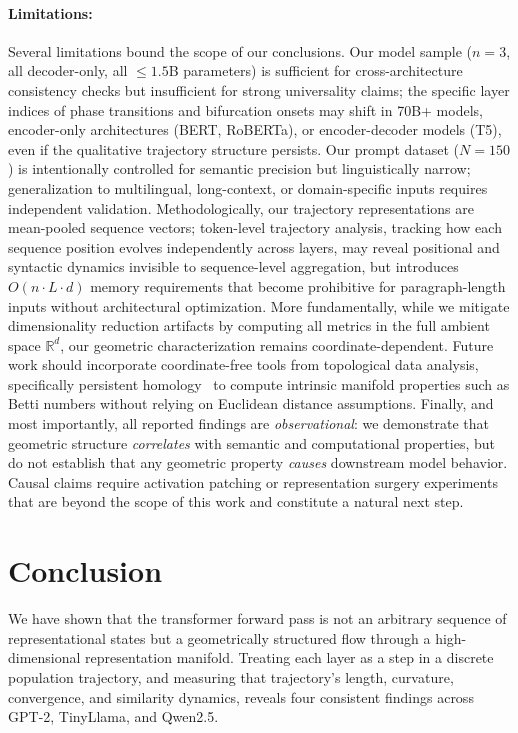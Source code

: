 \documentclass{article}
\begin{document}
\paragraph{Limitations:} Several limitations bound the scope of our conclusions. Our model sample ($n = 3$, all decoder-only, all $\leq 1.5$B parameters) is sufficient for cross-architecture consistency checks but insufficient for strong universality claims; the specific layer indices of phase transitions and bifurcation onsets may shift in 70B+ models, encoder-only architectures (BERT, RoBERTa), or encoder-decoder models (T5), even if the qualitative trajectory structure persists. Our prompt dataset ($N = 150$) is intentionally controlled for semantic precision but linguistically narrow; generalization to multilingual, long-context, or domain-specific inputs requires independent validation. Methodologically, our trajectory representations are mean-pooled sequence vectors; token-level trajectory analysis, tracking how each sequence position evolves independently across layers, may reveal positional and syntactic dynamics invisible to sequence-level aggregation, but introduces $O(n \cdot L \cdot d)$ memory requirements that become prohibitive for paragraph-length inputs without architectural optimization. More fundamentally, while we mitigate dimensionality reduction artifacts by computing all metrics in the full ambient space $\mathbb{R}^d$, our geometric characterization remains coordinate-dependent. Future work should incorporate coordinate-free tools from topological data analysis, specifically persistent homology~\cite{edelsbrunner2008persistent} to compute intrinsic manifold properties such as Betti numbers without relying on Euclidean distance assumptions. Finally, and most importantly, all reported findings are \textit{observational}: we demonstrate that geometric structure \textit{correlates} with semantic and computational properties, but do not establish that any geometric property \textit{causes} downstream model behavior. Causal claims require activation patching or representation surgery experiments~\cite{meng2022locating} that are beyond the scope of this work and constitute a natural next step.

\section{Conclusion}
\label{sec:conclusion}

We have shown that the transformer forward pass is not an arbitrary sequence of representational states but a geometrically structured flow through a high-dimensional representation manifold. Treating each layer as a step in a discrete population trajectory, and measuring that trajectory's length, curvature, convergence, and similarity dynamics, reveals four consistent findings across GPT-2, TinyLlama, and Qwen2.5.
\end{document}
